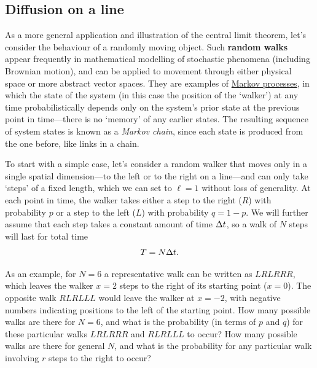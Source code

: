 \subsection{\label{sec:diffusion}Diffusion on a line}
As a more general application and illustration of the central limit theorem, let's consider the behaviour of a randomly moving object.
Such \textbf{random walks} appear frequently in mathematical modelling of stochastic phenomena (including Brownian motion), and can be applied to movement through either physical space or more abstract vector spaces.
They are examples of \href{https://en.wikipedia.org/wiki/Markov_process}{Markov processes}, in which the state of the system (in this case the position of the `walker') at any time probabilistically depends only on the system's prior state at the previous point in time---there is no `memory' of any earlier states.
The resulting sequence of system states is known as a \textit{Markov chain}, since each state is produced from the one before, like links in a chain.

To start with a simple case, let's consider a random walker that moves only in a single spatial dimension---to the left or to the right on a line---and can only take `steps' of a fixed length, which we can set to $\ell = 1$ without loss of generality.
At each point in time, the walker takes either a step to the right ($R$) with probability $p$ or a step to the left ($L$) with probability $q = 1 - p$.
We will further assume that each step takes a constant amount of time $\Delta t$, so a walk of $N$ steps will last for total time
\begin{equation*}
  T = N \Delta t.
\end{equation*}

\newpage %
As an example, for $N = 6$ a representative walk can be written as $LRLRRR$, which leaves the walker $x = 2$ steps to the right of its starting point ($x = 0$).
The opposite walk $RLRLLL$ would leave the walker at $x = -2$, with negative numbers indicating positions to the left of the starting point.
How many possible walks are there for $N = 6$, and what is the probability (in terms of $p$ and $q$) for these particular walks $LRLRRR$ and $RLRLLL$ to occur?
How many possible walks are there for general $N$, and what is the probability for any particular walk involving $r$ steps to the right to occur?
\begin{mdframed}
  \ \\[100 pt]
\end{mdframed}

